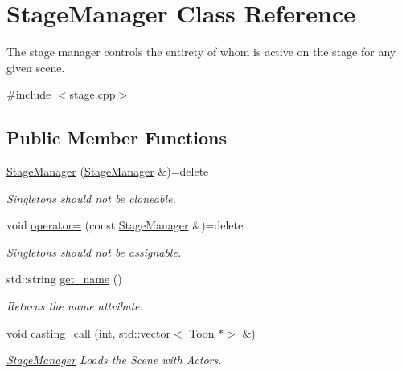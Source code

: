 \hypertarget{classStageManager}{}\section{Stage\+Manager Class Reference}
\label{classStageManager}


The stage manager controls the entirety of whom is active on the stage for any given scene.  




{\ttfamily \#include $<$stage.\+cpp$>$}

\subsection*{Public Member Functions}
\begin{DoxyCompactItemize}
\item 
\mbox{\label{classStageManager_a7044f497e4a2e6a2b30f33363353335c}} 
\mbox{\hyperlink{classStageManager_a7044f497e4a2e6a2b30f33363353335c}{Stage\+Manager}} (\mbox{\hyperlink{classStageManager}{Stage\+Manager}} \&)=delete
\begin{DoxyCompactList}\small\item\em Singletons should not be cloneable. \end{DoxyCompactList}\item 
\mbox{\label{classStageManager_a6507c82030f0d543859f21e54554ca38}} 
void \mbox{\hyperlink{classStageManager_a6507c82030f0d543859f21e54554ca38}{operator=}} (const \mbox{\hyperlink{classStageManager}{Stage\+Manager}} \&)=delete
\begin{DoxyCompactList}\small\item\em Singletons should not be assignable. \end{DoxyCompactList}\item 
std\+::string \mbox{\hyperlink{classStageManager_a6d08dfabf7c6f226d199c5f1ea5795a1}{get\+\_\+name}} ()
\begin{DoxyCompactList}\small\item\em Returns the name attribute. \end{DoxyCompactList}\item 
void \mbox{\hyperlink{classStageManager_a1fb738edf603ba2e32d30f93ba5b7f8d}{casting\+\_\+call}} (int, std\+::vector$<$ \mbox{\hyperlink{classToon}{Toon}} $\ast$$>$ \&)
\begin{DoxyCompactList}\small\item\em \mbox{\hyperlink{classStageManager}{Stage\+Manager}} Loads the Scene with Actors. \end{DoxyCompactList}\item 
$$
\end{DoxyCompactItemize}
